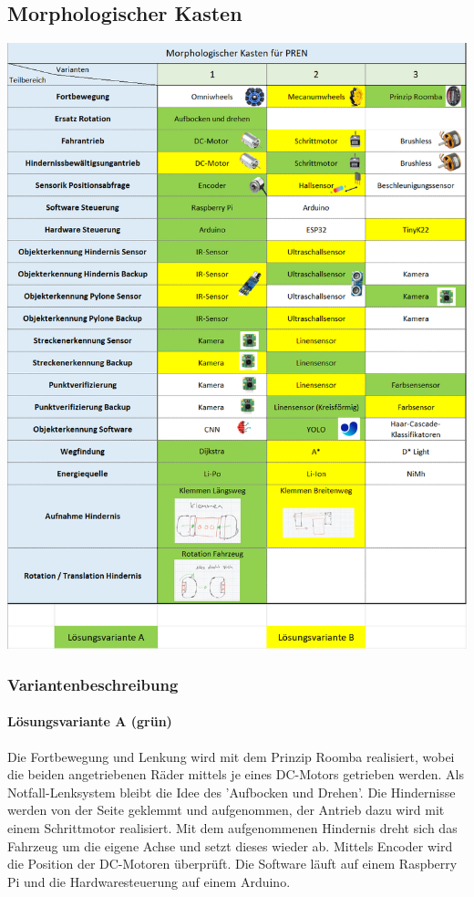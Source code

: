 \documentclass[../main.tex]{subfiles}
\begin{document}
\subsection{Morphologischer Kasten}
    \includegraphics[width=\textwidth]{img/Morphologischer_Kasten.png}

    \subsubsection{Variantenbeschreibung}
    \paragraph{Lösungsvariante A (grün)}
    Die Fortbewegung und Lenkung wird mit dem Prinzip Roomba realisiert, wobei die beiden angetriebenen Räder mittels je eines DC-Motors getrieben werden. Als Notfall-Lenksystem bleibt die Idee des 'Aufbocken und Drehen'. Die Hindernisse werden von der Seite geklemmt und aufgenommen, der Antrieb dazu wird mit einem Schrittmotor realisiert. Mit dem aufgenommenen Hindernis dreht sich das Fahrzeug um die eigene Achse und setzt dieses wieder ab. Mittels Encoder wird die Position der DC-Motoren überprüft. Die Software läuft auf einem Raspberry Pi und die Hardwaresteuerung auf einem Arduino. 
    
\end{document}
